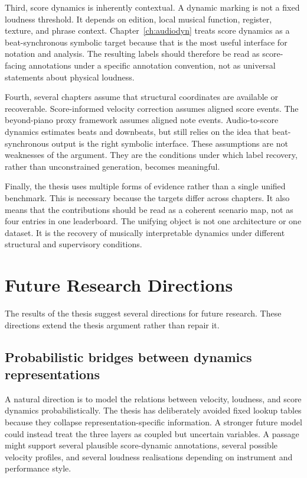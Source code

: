 Third, score dynamics is inherently contextual. A dynamic marking is not a fixed loudness threshold. It depends on edition, local musical function, register, texture, and phrase context. Chapter~\ref{ch:audiodyn} treats score dynamics as a beat-synchronous symbolic target because that is the most useful interface for notation and analysis. The resulting labels should therefore be read as score-facing annotations under a specific annotation convention, not as universal statements about physical loudness.

Fourth, several chapters assume that structural coordinates are available or recoverable. Score-informed velocity correction assumes aligned score events. The beyond-piano proxy framework assumes aligned note events. Audio-to-score dynamics estimates beats and downbeats, but still relies on the idea that beat-synchronous output is the right symbolic interface. These assumptions are not weaknesses of the argument. They are the conditions under which label recovery, rather than unconstrained generation, becomes meaningful.

Finally, the thesis uses multiple forms of evidence rather than a single unified benchmark. This is necessary because the targets differ across chapters. It also means that the contributions should be read as a coherent scenario map, not as four entries in one leaderboard. The unifying object is not one architecture or one dataset. It is the recovery of musically interpretable dynamics under different structural and supervisory conditions.

\section{Future Research Directions}
\label{sec:conclusion:future}

The results of the thesis suggest several directions for future research. These directions extend the thesis argument rather than repair it.

\subsection{Probabilistic bridges between dynamics representations}
\label{ssec:conclusion:future_bridge}

A natural direction is to model the relations between velocity, loudness, and score dynamics probabilistically. The thesis has deliberately avoided fixed lookup tables because they collapse representation-specific information. A stronger future model could instead treat the three layers as coupled but uncertain variables. A passage might support several plausible score-dynamic annotations, several possible velocity profiles, and several loudness realisations depending on instrument and performance style.

